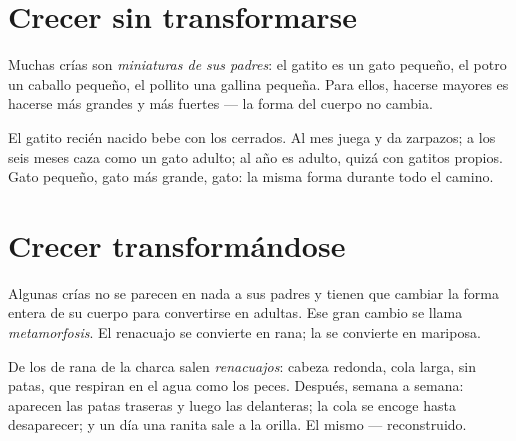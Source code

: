 \section{Crecer sin transformarse}

\begin{definition}\label{def:g2:animals-grow-up:direct}
Muchas crías son \emph{miniaturas de sus
padres}: el gatito es un gato pequeño,
el potro un caballo pequeño, el pollito una gallina pequeña. Para
ellos, hacerse mayores es hacerse más grandes y más fuertes --- la
forma del cuerpo no cambia.
\end{definition}

\begin{example}\label{ex:g2:animals-grow-up:kitten}
El gatito recién nacido bebe  con los  cerrados. Al mes juega
y da zarpazos; a los seis meses caza como un gato adulto; al año es
adulto, quizá con gatitos propios. Gato pequeño, gato más grande,
gato: la misma forma durante todo el camino.
\end{example}

\section{Crecer transformándose}

\begin{definition}[Metamorfosis]\label{def:g2:animals-grow-up:metamorphosis}
Algunas crías no se parecen en nada a sus padres y tienen que cambiar
la forma entera de su cuerpo para convertirse en adultas. Ese gran
cambio se llama \emph{metamorfosis}. El renacuajo
se convierte en rana; la  se convierte en mariposa.
\end{definition}

\begin{example}\label{ex:g2:animals-grow-up:frog}
De los  de rana de la charca salen \emph{renacuajos}:
cabeza redonda, cola larga, sin patas, que respiran en el agua como
los peces. Después, semana a semana: aparecen las patas traseras y
luego las delanteras; la cola se encoge hasta desaparecer; y un día
una ranita sale a la orilla. El mismo  --- reconstruido.
\end{example}

